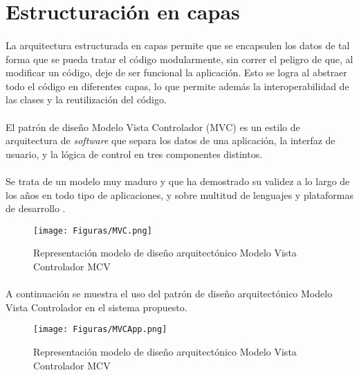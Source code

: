 \section{Estructuraci\'{o}n en capas}
\paragraph{}La arquitectura estructurada en capas permite que se encapsulen los datos de tal forma que se pueda tratar el código modularmente, sin correr el peligro de que, al modificar un código, deje de ser funcional la aplicación. Esto se logra al abstraer todo el código en diferentes capas, lo que permite además la interoperabilidad de las clases y la reutilización del código.
\paragraph{}El patrón de diseño Modelo Vista Controlador (MVC) es un estilo de arquitectura de \textit{software} que separa los datos de una aplicación, la interfaz de usuario, y la lógica de control en tres componentes distintos.
\paragraph{}Se trata de un modelo muy maduro y que ha demostrado su validez a lo largo de los años en todo tipo de aplicaciones, y sobre multitud de lenguajes y plataformas de desarrollo \cite{noauthor_modelo_2019}.

\begin{figure}[H] %
	\centering
	\texttt{[image: Figuras/MVC.png]}
	\caption{Representación modelo de diseño arquitectónico Modelo Vista Controlador MCV}
	\label{fig:MVC}
\end{figure}

\paragraph{}A continuación se muestra el uso del patrón de diseño arquitectónico Modelo Vista Controlador en el sistema propuesto.

\begin{figure}[H] %
	\centering
	\texttt{[image: Figuras/MVCApp.png]}
	\caption{Representación modelo de diseño arquitectónico Modelo Vista Controlador MCV}
	\label{fig:MVCApp}
\end{figure}

